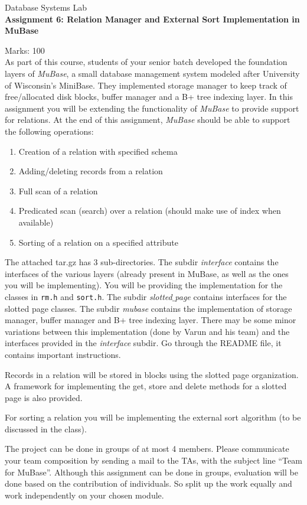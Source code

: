 \documentclass[12pt]{article}
\begin{document}
\thispagestyle{empty}

\begin{center}
{\large Database Systems Lab} \\
{\bf Assignment 6: Relation Manager and External Sort Implementation in MuBase} \\
\end{center}

\noindent
Marks: 100 \\

As part of this course, students of your senior batch developed the
foundation layers of {\em MuBase}, a small database management system
modeled after University of Wisconsin's MiniBase.  They implemented
storage manager to keep track of free/allocated disk blocks, 
buffer manager and a B+ tree indexing layer. In this assignment you
will be extending the functionality of {\em MuBase} to provide 
support for relations. At the end of this assignment, {\em MuBase} 
should be able to support the following operations:

\begin{enumerate}
\item Creation of a relation with specified schema
\item Adding/deleting records from a relation
\item Full scan of a relation
\item Predicated scan (search) over a relation (should make
      use of index when available)
\item Sorting of a relation on a specified attribute
\end{enumerate}

The attached tar.gz has 3 sub-directories. The subdir {\em interface}
contains the interfaces of the various layers (already present in 
MuBase, as well as the ones you will be implementing). You will be 
providing the implementation for the classes in {\tt rm.h} and {
\tt sort.h}. The subdir {\em slotted$\_$page} contains interfaces
for the slotted page classes. The subdir {\em mubase} contains
the implementation of storage manager, buffer manager and B+ tree
indexing layer. There may be some minor variations between this
implementation (done by Varun and his team) and the interfaces 
provided in the {\em interface} subdir. 
Go through the README file, it contains important instructions.

Records in a relation will be stored in blocks using the slotted
page organization.  A framework for implementing the get, store 
and delete methods for a slotted page is also provided.

For sorting a relation you will be implementing the external 
sort algorithm (to be discussed in the class).

The project can be done in groups of at most 4 members. Please 
communicate your team composition by sending a mail to the TAs,
with the subject line ``Team for MuBase''. Although this assignment 
can be done in groups, evaluation will be done based on the 
contribution of individuals. So split up the work equally and 
work independently on your chosen module. 
\end{document}
